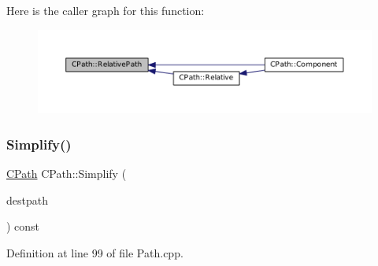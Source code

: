 Here is the caller graph for this function\+:\nopagebreak
\begin{figure}[H]
\begin{center}
\leavevmode
\includegraphics[width=350pt]{classCPath_a76f73670ecc0a434c2f8a1ea0f1a040e_icgraph}
\end{center}
\end{figure}
\hypertarget{classCPath_aa52dcb50c943a8abc8883db5ec43a45e}{}\label{classCPath_aa52dcb50c943a8abc8883db5ec43a45e} 
\subsubsection{\texorpdfstring{Simplify()}{Simplify()}}
{\footnotesize\ttfamily \hyperlink{classCPath}{C\+Path} C\+Path\+::\+Simplify (\begin{DoxyParamCaption}\item[{const \hyperlink{classCPath}{C\+Path} \&}]{destpath }\end{DoxyParamCaption}) const}



Definition at line 99 of file Path.\+cpp.


